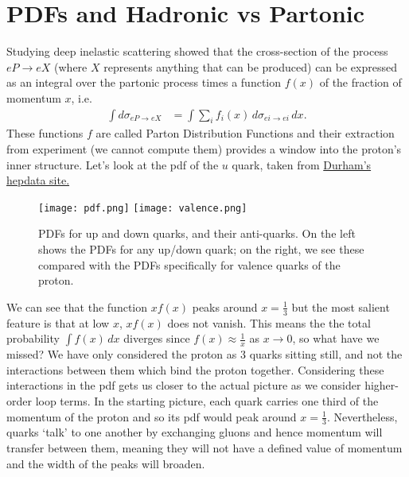 \documentclass[relqm.tex]{subfiles}
\begin{document}
\chapter{PDFs and Hadronic vs Partonic}
Studying deep inelastic scattering showed that the cross-section of the process $eP\to eX$ (where $X$ represents anything that can be produced) can be expressed as an integral over the partonic process times a function $f(x)$ of the fraction of momentum $x$, i.e.
\begin{align}
    \int d\sigma_{eP\to eX} &= \int \sum_i f_i(x)\,d\sigma_{ei\to ei}\,dx.
\end{align}
These functions $f$ are called Parton Distribution Functions and their extraction from experiment (we cannot compute them) provides a window into the proton's inner structure. 
Let's look at the pdf of the $u$ quark, taken from \href{http://hepdata.cedar.ac.uk/pdf/pdf3.html}{Durham's hepdata site.}
\begin{figure}[H]
    \centering
    \texttt{[image: pdf.png]}
    \texttt{[image: valence.png]}
    \caption{PDFs for up and down quarks, and their anti-quarks. On the left shows the PDFs for any up/down quark; on the right, we see these compared with the PDFs specifically for valence quarks of the proton.}
    \vspace{-20pt}
\end{figure}
We can see that the function $xf(x)$ peaks around $x=\frac13$ but the most salient feature is that at low $x$, $xf(x)$ does not vanish. 
This means the the total probability $\int f(x)\,dx$ diverges since $f(x)\approx\frac1x$ as $x\to0$, so what have we missed?
We have only considered the proton as 3 quarks sitting still, and not the interactions between them which bind the proton together. 
Considering these interactions in the pdf gets us closer to the actual picture as we consider higher-order loop terms. 
In the starting picture, each quark carries one third of the momentum of the proton and so its pdf would peak around $x=\frac13$.
Nevertheless, quarks `talk' to one another by exchanging gluons and hence momentum will transfer between them, meaning they will not have a defined value of momentum and the width of the peaks will broaden.
\end{document}
